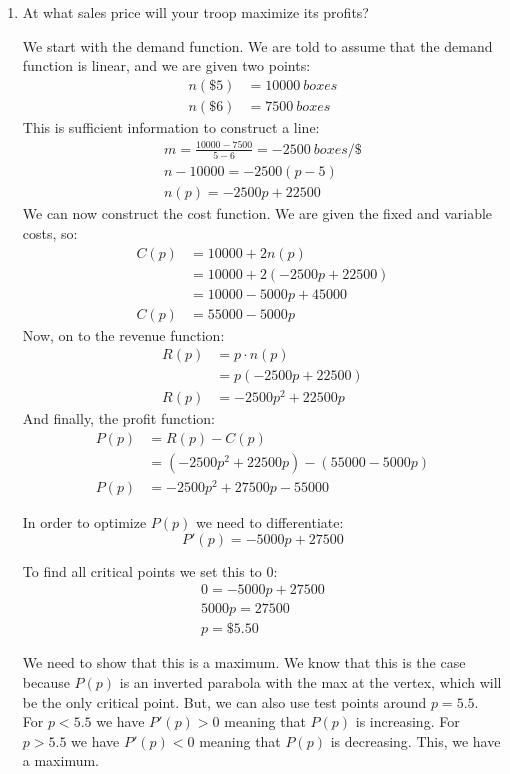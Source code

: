 \documentclass[letterpaper,12pt,fleqn]{article}
\begin{document}
\begin{enumerate}
\item At what sales price will your troop maximize its profits?

  We start with the demand function.  We are told to assume that the demand function is linear, and we are given
  two points:
  \begin{align*}
    n(\$5) &= \SI{10000}{boxes} \\
    n(\$6) &= \SI{7500}{boxes}
  \end{align*}
  This is sufficient information to construct a line:
  \begin{gather*}
    m=\frac{10000-7500}{5-6}=\SI{-2500}{boxes/\$} \\
    n-10000=-2500(p-5) \\
    n(p)=-2500p+22500
  \end{gather*}
  We can now construct the cost function.  We are given the fixed and variable costs, so:
  \begin{align*}
    C(p) &= 10000+2n(p) \\
    &= 10000+2(-2500p+22500) \\
    &= 10000-5000p+45000 \\
    C(p) &= 55000-5000p
  \end{align*}
  Now, on to the revenue function:
  \begin{align*}
    R(p) &= p\cdot n(p) \\
    &= p(-2500p+22500) \\
    R(p) &= -2500p^2+22500p
  \end{align*}
  And finally, the profit function:
  \begin{align*}
    P(p) &= R(p)-C(p) \\
    &= (-2500p^2+22500p)-(55000-5000p) \\
    P(p) &= -2500p^2+27500p-55000
  \end{align*}
  
  In order to optimize \(P(p)\) we need to differentiate:
  \[P'(p)=-5000p+27500\]

  To find all critical points we set this to 0:
  \begin{gather*}
    0=-5000p+27500 \\
    5000p=27500 \\
    p=\$5.50
  \end{gather*}

  We need to show that this is a maximum.  We know that this is the case because \(P(p)\) is an inverted parabola
  with the max at the vertex, which will be the only critical point.  But, we can also use test points around
  \(p=5.5\).  For \(p<5.5\) we have \(P'(p)>0\) meaning that \(P(p)\) is increasing.  For \(p>5.5\) we have
  \(P'(p)<0\) meaning that \(P(p)\) is decreasing.  This, we have a maximum.


\end{enumerate}
\end{document}
